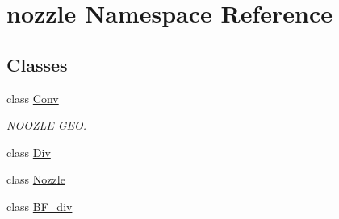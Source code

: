 \hypertarget{namespacenozzle}{\section{nozzle \-Namespace \-Reference}
\label{namespacenozzle}
}
\subsection*{\-Classes}
\begin{DoxyCompactItemize}
\item 
class \hyperlink{classnozzle_1_1Conv}{\-Conv}
\begin{DoxyCompactList}\small\item\em \-N\-O\-O\-Z\-L\-E \-G\-E\-O. \end{DoxyCompactList}\item 
class \hyperlink{classnozzle_1_1Div}{\-Div}
\item 
class \hyperlink{classnozzle_1_1Nozzle}{\-Nozzle}
\item 
class \hyperlink{classnozzle_1_1BF__div}{\-B\-F\-\_\-div}
\end{DoxyCompactItemize}
